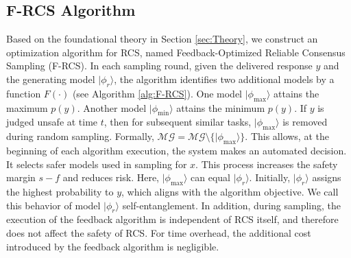 \documentclass[11pt]{article}
\begin{document}
\subsection{F-RCS Algorithm}
Based on the foundational theory in Section \ref{sec:Theory}, we construct an optimization algorithm for RCS, named Feedback-Optimized Reliable Consensus Sampling (F-RCS). In each sampling round, given the delivered response $y$ and the generating model $|\phi_r\rangle$, the algorithm identifies two additional models by a function $F(\cdot)$ (see Algorithm \ref{alg:F-RCS}). One model $|\phi_{\max}\rangle$ attains the maximum $p(y)$. Another model $|\phi_{\min}\rangle$ attains the minimum $p(y)$. If $y$ is judged unsafe at time $t$, then for subsequent similar tasks, $|\phi_{\max}\rangle$ is removed during random sampling. Formally, $\mathcal{MG} = \mathcal{MG} \setminus \{|\phi_{\max}\rangle\}.$ This allows, at the beginning of each algorithm execution, the system makes an automated decision. It selects safer models used in sampling for $x$. This process increases the safety margin $s - f$ and reduces risk. Here, $|\phi_{\max}\rangle$ can equal $|\phi_{r}\rangle$. Initially, $|\phi_{r}\rangle$ assigns the highest probability to $y$, which aligns with the algorithm objective. We call this behavior of model $|\phi_{r}\rangle$ self-entanglement. In addition, during sampling, the execution of the feedback algorithm is independent of RCS itself, and therefore does not affect the safety of RCS. For time overhead, the additional cost introduced by the feedback algorithm is negligible.



\begin{algorithm}[h]
\SetAlgoLined
{}

    

\caption{F-RCS Algorithm}
\label{alg:F-RCS}
\end{algorithm}
\end{document}
